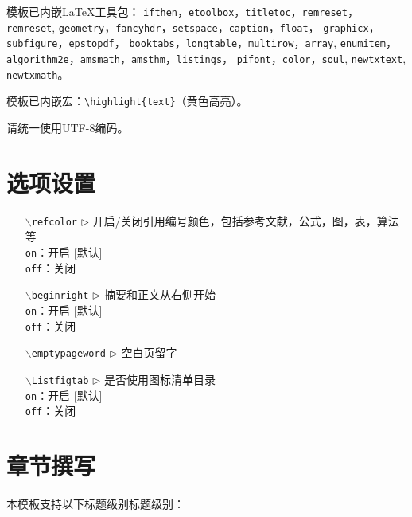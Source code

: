 模板已内嵌LaTeX工具包：
 {\tt ifthen}，{\tt etoolbox}，{\tt titletoc}，{\tt remreset}，{\tt remreset},
 {\tt geometry}，{\tt fancyhdr}，{\tt setspace}，{\tt caption}，{\tt float}，
 {\tt graphicx}，{\tt subfigure}，{\tt epstopdf}，
 {\tt book\-tabs}，{\tt longtable}，{\tt multirow}，{\tt array}, {\tt enumitem}，
 {\tt algorithm2e}，{\tt amsmath}，{\tt amsthm}，{\tt listings}，
 {\tt pifont}，{\tt color}，{\tt soul}, {\tt newtxtext}, {\tt newtxmath}。

模板已内嵌宏：\verb|\highlight{text}|（黄色高亮）。

请统一使用UTF-8编码。



\section{选项设置}

\begin{itemize}[leftmargin=3cm]
  \item[{\tt  $\backslash$refcolor} $\triangleright$]  开启/关闭引用编号颜色，包括参考文献，公式，图，表，算法等\\
  \texttt{on}：开启 [默认]\\
  \texttt{off}：关闭
  \item[{\tt $\backslash$beginright} $\triangleright$]  摘要和正文从右侧开始\\
  \texttt{on}：开启 [默认]\\
  \texttt{off}：关闭
  \item[{\tt $\backslash$emptypageword} $\triangleright$]  空白页留字
  \item[{\tt $\backslash$Listfigtab} $\triangleright$]  是否使用图标清单目录\\
  \texttt{on}：开启 [默认]\\
  \texttt{off}：关闭
\end{itemize}


\section{章节撰写}
本模板支持以下标题级别标题级别：

